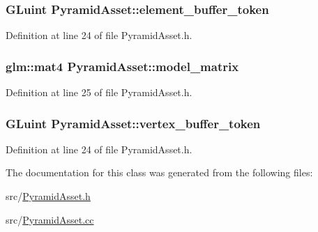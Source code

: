 \subsubsection[{element\+\_\+buffer\+\_\+token}]{\setlength{\rightskip}{0pt plus 5cm}G\+Luint Pyramid\+Asset\+::element\+\_\+buffer\+\_\+token\hspace{0.3cm}{\ttfamily [private]}}\label{class_pyramid_asset_a6f7e2f50904d2941e33df8eb7f5f9c2d}


Definition at line 24 of file Pyramid\+Asset.\+h.

\hypertarget{class_pyramid_asset_abdae2a9161e42fc02297524d98d4b3cc}{}
\subsubsection[{model\+\_\+matrix}]{\setlength{\rightskip}{0pt plus 5cm}glm\+::mat4 Pyramid\+Asset\+::model\+\_\+matrix\hspace{0.3cm}{\ttfamily [private]}}\label{class_pyramid_asset_abdae2a9161e42fc02297524d98d4b3cc}


Definition at line 25 of file Pyramid\+Asset.\+h.

\hypertarget{class_pyramid_asset_a54d9cec42bc77d07a66e6c1cd55049b0}{}
\subsubsection[{vertex\+\_\+buffer\+\_\+token}]{\setlength{\rightskip}{0pt plus 5cm}G\+Luint Pyramid\+Asset\+::vertex\+\_\+buffer\+\_\+token\hspace{0.3cm}{\ttfamily [private]}}\label{class_pyramid_asset_a54d9cec42bc77d07a66e6c1cd55049b0}


Definition at line 24 of file Pyramid\+Asset.\+h.



The documentation for this class was generated from the following files\+:\begin{DoxyCompactItemize}
\item 
src/\hyperlink{_pyramid_asset_8h}{Pyramid\+Asset.\+h}\item 
src/\hyperlink{_pyramid_asset_8cc}{Pyramid\+Asset.\+cc}\end{DoxyCompactItemize}
